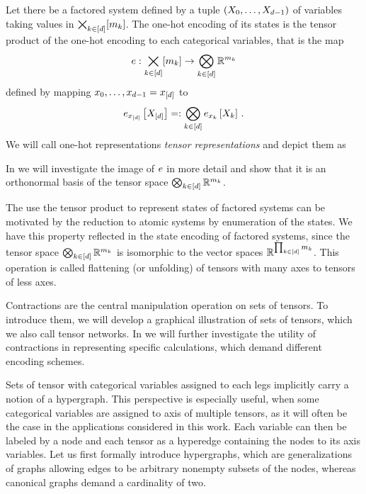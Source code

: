 \begin{definition}
	Let there be a factored system defined by a tuple $(X_{0},\ldots,X_{d-1})$ of variables taking values in $\bigtimes_{k\in[d]}[m_{k}]$.
	The one-hot encoding of its states is the tensor product of the one-hot encoding to each categorical variables, that is the map
		\[ e : \bigtimes_{k\in[d]}[m_{k}] \rightarrow  \bigotimes_{k\in[d]} \mathbb{R}^{m_{k}} \]
	defined by mapping $x_{0},\ldots,x_{d-1}=x_{[d]}$ to
	\begin{align*}
		 e_{x_{[d]}}\left[X_{[d]}\right]
		=: \bigotimes_{k\in[d]} e_{x_{k}}\left[X_{k}\right] \, .
	\end{align*}
	We will call one-hot representations \emph{tensor representations} and depict them as
	\begin{center}
		
	\end{center}
\end{definition}

In  we will investigate the image of $e$ in more detail and show that it is an orthonormal basis of the tensor space $\bigotimes_{k\in[d]} \mathbb{R}^{m_{k}}$.

\begin{remark}
	The use the tensor product to represent states of factored systems can be motivated by the reduction to atomic systems by enumeration of the states.
	We have this property reflected in the state encoding of factored systems, since the tensor space $\bigotimes_{k\in[d]} \mathbb{R}^{m_{k}}$ is isomorphic to the vector spaces $\mathbb{R}^{\prod_{k\in[d]}m_{k}}$.
	This operation is called flattening (or unfolding) of tensors with many axes to tensors of less axes.
\end{remark}


Contractions are the central manipulation operation on sets of tensors.
To introduce them, we will develop a graphical illustration of sets of tensors, which we also call tensor networks.
In  we will further investigate the utility of contractions in representing specific calculations, which demand different encoding schemes.



Sets of tensor with categorical variables assigned to each legs implicitly carry a notion of a hypergraph.
This perspective is especially useful, when some categorical variables are assigned to axis of multiple tensors, as it will often be the case in the applications considered in this work.
Each variable can then be labeled by a node and each tensor as a hyperedge containing the nodes to its axis variables.
Let us first formally introduce hypergraphs, which are generalizations of graphs allowing edges to be arbitrary nonempty subsets of the nodes, whereas canonical graphs demand a cardinality of two.

